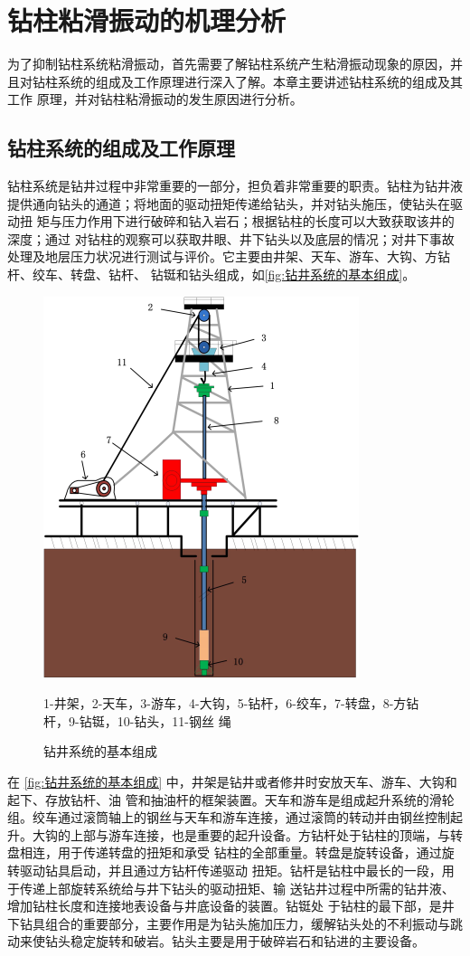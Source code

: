 \documentclass[12pt,hyperref,a4paper,UTF8]{ctexart}
\begin{document}
	
	
	
	
	\section{钻柱粘滑振动的机理分析}
	为了抑制钻柱系统粘滑振动，首先需要了解钻柱系统产生粘滑振动现象的原因，并 且对钻柱系统的组成及工作原理进行深入了解。本章主要讲述钻柱系统的组成及其工作 原理，并对钻柱粘滑振动的发生原因进行分析。
	\subsection{钻柱系统的组成及工作原理}
	钻柱系统是钻井过程中非常重要的一部分，担负着非常重要的职责。钻柱为钻井液 提供通向钻头的通道；将地面的驱动扭矩传递给钻头，并对钻头施压，使钻头在驱动扭 矩与压力作用下进行破碎和钻入岩石；根据钻柱的长度可以大致获取该井的深度；通过 对钻柱的观察可以获取井眼、井下钻头以及底层的情况；对井下事故处理及地层压力状况进行测试与评价。它主要由井架、天车、游车、大钩、方钻杆、绞车、转盘、钻杆、 钻铤和钻头组成\cite{巩全成}，如\autoref{fig:钻井系统的基本组成}。
	\begin{figure}[!htbp]
		\centering
		\includegraphics[width=0.5\linewidth]{figures/钻井系统的基本组成}
		\caption{钻井系统的基本组成}
		\small{1-井架，2-天车，3-游车，4-大钩，5-钻杆，6-绞车，7-转盘，8-方钻杆，9-钻铤，10-钻头，11-钢丝 绳}
		\label{fig:钻井系统的基本组成}
	\end{figure}
	
	在 \autoref{fig:钻井系统的基本组成} 中，井架是钻井或者修井时安放天车、游车、大钩和起下、存放钻杆、油 管和抽油杆的框架装置。天车和游车是组成起升系统的滑轮组。绞车通过滚筒轴上的钢丝与天车和游车连接，通过滚筒的转动并由钢丝控制起升。大钩的上部与游车连接，也是重要的起升设备。方钻杆处于钻柱的顶端，与转盘相连，用于传递转盘的扭矩和承受 钻柱的全部重量。转盘是旋转设备，通过旋转驱动钻具启动，并且通过方钻杆传递驱动 扭矩。钻杆是钻柱中最长的一段，用于传递上部旋转系统给与井下钻头的驱动扭矩、输 送钻井过程中所需的钻井液、增加钻柱长度和连接地表设备与井底设备的装置。钻铤处 于钻柱的最下部，是井下钻具组合的重要部分，主要作用是为钻头施加压力，缓解钻头处的不利振动与跳动来使钻头稳定旋转和破岩。钻头主要是用于破碎岩石和钻进的主要设备\cite{许帅}。
	
\end{document}
